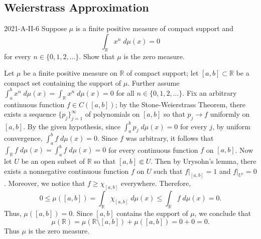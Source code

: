 \documentclass{article}
\begin{document}
	
	\subsection{Weierstrass Approximation}
	\begin{prb}{2021-A-II-6}
		Suppose $\mu$ is a finite positive measure of compact support and 
		\begin{equation*}
			\int_\mathbb{R}x^n\;d\mu(x) = 0
		\end{equation*}
		for every $n \in \{0,1,2, \ldots\}$. Show that $\mu$ is the zero measure. 
	\end{prb}
	Let $\mu$ be a finite positive measure on $\mathbb{R}$ of compact support; let $[a, b] \subset \mathbb{R}$ be a compact set containing the support of $\mu$. Further assume $\int_{a}^{b}x^n\;d\mu(x) = \int_\mathbb{R}x^n\;d\mu(x) =0$ for all $n\in \{0, 1, 2, \ldots\}$. Fix an arbitrary continuous function $f \in C([a,b])$; by the Stone-Weierstrass Theorem, there exists a sequence $\{p_j\}_{j = 1}^{\infty}$ of polynomials on $[a,b]$ so that $p_j \to f$ uniformly on $[a,b]$. By the given hypothesis, since $\int_{a}^{b}p_j\;d\mu(x) =0$ for every $j$, by uniform convergence, $\int_{a}^{b}f\;d\mu(x) = 0$. Since $f$ was arbitrary, it follows that $\int_{\mathbb{R}}f\;d\mu(x) = \int_{a}^{b}f\;d\mu(x) = 0$ for every continuous function $f$ on $[a,b]$. Now let $U$ be an open subset of $\mathbb{R}$ so that $[a,b] \Subset U$. Then by Urysohn's lemma, there exists a nonnegative continuous function $f$ on $U$ such that $f|_{[a,b]} = 1$ and $f|_{U^c} =0$. Moreover, we notice that $f \geq \chi_{[a,b]}$ everywhere. Therefore, 
	\begin{equation*}
		0 \leq \mu([a,b]) = \int_{\mathbb{R}}\chi_{[a,b]}\;d\mu(x) \leq \int_{\mathbb{R}}f\;d\mu(x) = 0.  
	\end{equation*}
	Thus, $\mu([a,b]) = 0$. Since $[a,b]$ contains the support of $\mu$, we conclude that 
	\begin{equation*}
		\mu(\mathbb{R}) = \mu(\mathbb{R}\setminus[a,b]) + \mu([a,b]) = 0 + 0 = 0. 
	\end{equation*}
	Thus $\mu$ is the zero measure. 
	
\end{document}

